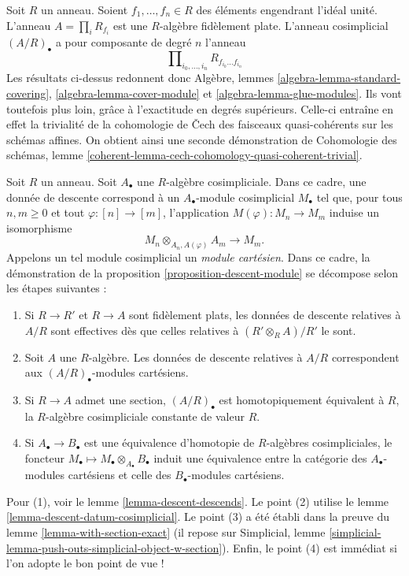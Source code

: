 \begin{remark}
\label{remark-standard-covering}
Soit $R$ un anneau. Soient $f_1, \ldots, f_n\in R$ des éléments engendrant
l'idéal unité. L'anneau $A = \prod_i R_{f_i}$ est une
$R$-algèbre fidèlement plate. L'anneau cosimplicial $(A/R)_\bullet$
a pour composante de degré $n$ l'anneau
$$
\prod\nolimits_{i_0, \ldots, i_n} R_{f_{i_0}\ldots f_{i_n}}
$$
Les résultats ci-dessus redonnent donc
Algèbre, lemmes \ref{algebra-lemma-standard-covering},
\ref{algebra-lemma-cover-module} et \ref{algebra-lemma-glue-modules}.
Ils vont toutefois plus loin, grâce à l'exactitude en degrés supérieurs.
Celle-ci entraîne en effet la trivialité de la cohomologie de {\v C}ech
des faisceaux quasi-cohérents sur les schémas affines.
On obtient ainsi une seconde démonstration de
Cohomologie des schémas, lemme
\ref{coherent-lemma-cech-cohomology-quasi-coherent-trivial}.
\end{remark}

\begin{remark}
\label{remark-homotopy-equivalent-cosimplicial-algebras}
Soit $R$ un anneau. Soit $A_\bullet$ une $R$-algèbre cosimpliciale.
Dans ce cadre, une donnée de descente correspond à un
$A_\bullet$-module cosimplicial $M_\bullet$ tel que, pour tous
$n, m \geq 0$ et tout $\varphi : [n] \to [m]$,
l'application $M(\varphi) : M_n \to M_m$ induise un isomorphisme
$$
M_n \otimes_{A_n, A(\varphi)} A_m \longrightarrow M_m.
$$
Appelons un tel module cosimplicial un {\it module cartésien}.
Dans ce cadre, la démonstration de la proposition \ref{proposition-descent-module}
se décompose selon les étapes suivantes :
\begin{enumerate}
\item Si $R \to R'$ et $R \to A$ sont fidèlement plats,
les données de descente relatives à $A/R$ sont effectives dès que
celles relatives à $(R' \otimes_R A)/R'$ le sont.
\item Soit $A$ une $R$-algèbre. Les données de descente relatives à $A/R$
correspondent aux $(A/R)_\bullet$-modules cartésiens.
\item Si $R \to A$ admet une section, $(A/R)_\bullet$ est homotopiquement
équivalent à $R$, la $R$-algèbre cosimpliciale constante de valeur $R$.
\item Si $A_\bullet \to B_\bullet$ est une équivalence d'homotopie
de $R$-algèbres cosimpliciales, le foncteur
$M_\bullet \mapsto M_\bullet \otimes_{A_\bullet} B_\bullet$
induit une équivalence entre la catégorie des
$A_\bullet$-modules cartésiens et celle des $B_\bullet$-modules cartésiens.
\end{enumerate}
Pour (1), voir le lemme \ref{lemma-descent-descends}.
Le point (2) utilise le lemme \ref{lemma-descent-datum-cosimplicial}.
Le point (3) a été établi dans la preuve du lemme \ref{lemma-with-section-exact}
(il repose sur Simplicial,
lemme \ref{simplicial-lemma-push-outs-simplicial-object-w-section}).
Enfin, le point (4) est immédiat si l'on adopte le bon point de vue !
\end{remark}








